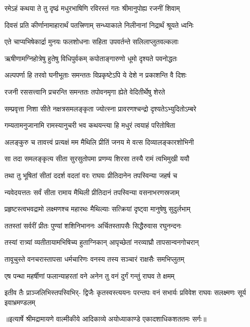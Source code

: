 \twolineshloka
{रमेऽहं कथया ते तु दृष्ढं मधुरभाषिणि}
{रविरस्तं गतः श्रीमानुपोह्य रजनीं शिवाम्} %

\twolineshloka
{दिवसं प्रति कीर्णानामाहारार्थं पतत्त्रिणाम्}
{सन्ध्याकाले निलीनानां निद्रार्थं श्रूयते ध्वनिः} %

\twolineshloka
{एते चाप्यभिषेकार्द्रा मुनयः फलशोधनाः}
{सहिता उपवर्तन्ते सलिलाप्लुतवल्कलाः} %

\twolineshloka
{ऋषीणामग्निहोत्रेषु हुतेषु विधिपुर्वकम्}
{कपोताङ्गारुणो धूमो दृश्यते पवनोद्धतः} %

\twolineshloka
{अल्पपर्णा हि तरवो घनीभूताः समन्ततः}
{विप्रकृष्टेऽपि ये देशे न प्रकाशन्ति वै दिशः} %

\twolineshloka
{रजनी रससत्त्वानि प्रचरन्ति समन्ततः}
{तपोवनमृगा ह्येते वेदितीर्थेषु शेरते} %

\twolineshloka
{सम्प्रवृत्ता निशा सीते नक्षत्रसमलङ्कृता}
{ज्योत्स्ना प्रावरणश्चन्द्रो दृश्यतेऽभ्युदितोऽम्बरे} %

\twolineshloka
{गम्यतामनुजानामि रामस्यानुचरी भव}
{कथयन्त्या हि मधुरं त्वयाहं परितोषिता} %

\twolineshloka
{अलङ्कुरु च तावत्त्वं प्रत्यक्षं मम मैथिलि}
{प्रीतिं जनय मे वत्स दिव्यालङ्कारशोभिनी} %

\twolineshloka
{सा तदा समलङ्कृत्य सीता सुरसुतोपमा}
{प्रणम्य शिरसा तस्यै रामं त्वभिमुखी ययौ} %

\twolineshloka
{तथा तु भूषितां सीतां ददर्श वदतां वरः}
{राघवः प्रीतिदानेन तपस्विन्या जहर्ष च} %

\twolineshloka
{न्यवेदयत्ततः सर्वं सीता रामाय मैथिली}
{प्रीतिदानं तपस्विन्या वसनाभरणस्रजाम्} %

\twolineshloka
{प्रहृष्टस्त्वभवद्रामो लक्ष्मणश्च महारथः}
{मैथिल्याः सत्क्रियां दृष्ट्वा मानुषेषु सुदुर्लभाम्} %

\twolineshloka
{ततस्तां सर्वरीं प्रीतः पुण्यां शशिनिभाननः}
{अर्चितस्तापसैः सिद्धैरुवास रघुनन्दनः} %

\twolineshloka
{तस्यां रात्र्यां व्यतीतायामभिषिच्य हुताग्निकान्}
{आपृच्छेतां नरव्याघ्रौ तापसान्वनगोचरान्} %

\twolineshloka
{तावूचुस्ते वनचरास्तापसा धर्मचारिणः}
{वनस्य तस्य सञ्चारं राक्षसैः समभिप्लुतम्} %

\twolineshloka
{एष पन्था महर्षीणां फलान्याहरतां वने}
{अनेन तु वनं दुर्गं गन्तुं राघव ते क्षमम्} %

\fourlineindentedshloka
{इतीव तैः प्राञ्जलिभिस्तपस्विभिर्-}
{द्विजैः कृतस्वस्त्ययनः परन्तपः}
{वनं सभार्यः प्रविवेश राघवः}
{सलक्ष्मणः सूर्य इवाभ्रमण्डलम्} %


{॥इत्यार्षे श्रीमद्रामायणे वाल्मीकीये आदिकाव्ये अयोध्याकाण्डे एकादशाधिकशततमः सर्गः॥}

